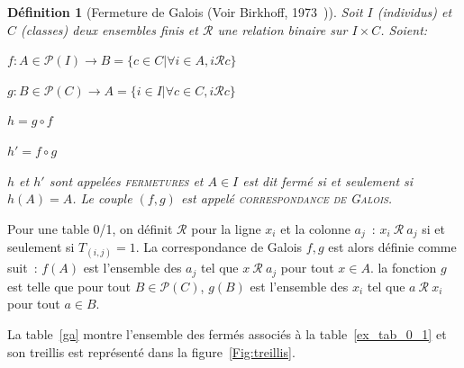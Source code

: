 \documentclass[a4paper]{report}
\newtheorem{definition}{Définition}[chapter]
\begin{document}
\begin{definition}[Fermeture de Galois (Voir Birkhoff, 1973~\cite{birkhoff1973})]

Soit $I$ (\-individus) et $C$ (classes) deux ensembles finis et $\mathcal{R}$ une relation binaire sur $I \times C$.
Soient:

$f: A \in \mathcal{P}(I) \rightarrow B = \{c \in C | \forall i \in A, i \mathcal{R} c \} $

$g: B \in \mathcal{P}(C) \rightarrow A = \{i \in I | \forall c \in C, i \mathcal{R} c \} $

$h = g \circ f$

$h' = f \circ g$

$h$ et $h'$ sont appelées \textsc{fermetures} et $A \in I$ est dit fermé si et seulement si $h(A) = A$.
Le couple $(f, g)$ est appelé \textsc{correspondance de Galois}.
\end{definition}

Pour une table 0/1, on définit $\mathcal{R}$ pour la ligne $x_i$ et la colonne $a_j$~:
 $x_i~\mathcal{R}~a_j$ si et seulement si $T_{(i,j)} = 1$.
La correspondance de Galois $f,g$ est alors définie comme suit~: $f(A)$ est l'ensemble des $a_j$ tel que $x~\mathcal{R}~a_j$ pour tout $x \in A$.
 la fonction $g$ est telle que pour tout $B \in \mathcal{P}(C)$, $g(B)$ est l'ensemble des $x_i$ tel que $a~\mathcal{R}~x_i$ pour tout $a \in B$.

La table~\ref{ga} montre l'ensemble des fermés associés à la table~\ref{ex_tab_0_1} et son treillis est représenté dans la figure~\ref{Fig:treillis}.
\end{document}

